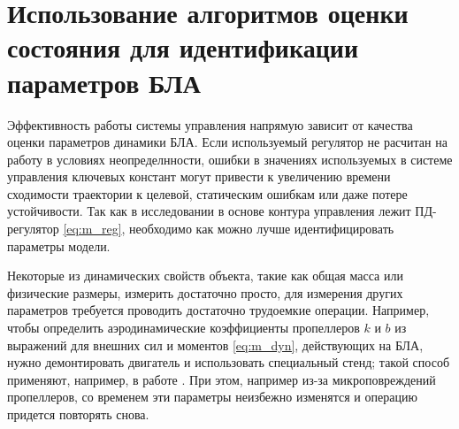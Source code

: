 \section{Использование алгоритмов оценки состояния для идентификации параметров БЛА}

Эффективность работы системы управления напрямую зависит от качества оценки параметров динамики БЛА.
Если используемый регулятор не расчитан на работу в условиях неопределнности, ошибки в значениях используемых в системе управления ключевых констант могут привести к увеличению времени сходимости траектории к целевой, статическим ошибкам или даже потере устойчивости.
Так как в исследовании в основе контура управления лежит ПД-регулятор \ref{eq:m_reg}, необходимо как можно лучше идентифицировать параметры модели. 

Некоторые из динамических свойств объекта, такие как общая масса или физические размеры, измерить достаточно просто, для измерения других параметров требуется проводить достаточно трудоемкие операции.
Например, чтобы определить аэродинамические коэффициенты пропеллеров
$k$ и $b$
из выражений для внешних сил и моментов \ref{eq:m_dyn}, действующих на БЛА,
нужно демонтировать двигатель и использовать специальный стенд; такой способ применяют, например, в работе \cite{Ryll01}. При этом, например из-за микроповреждений пропеллеров, со временем эти параметры неизбежно изменятся и операцию придется повторять снова.

